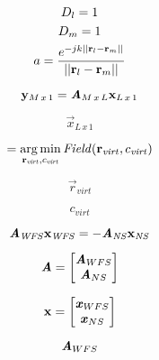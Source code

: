 \documentclass[10pt]{report}
\begin{document}
\begin{gather*}
	D_l = 1 \\
	D_m = 1 \\
	a = \frac{e^{-j k || \mathbf{r}_{l} - \mathbf{r}_{m} ||}}{|| \mathbf{r}_{l} - \mathbf{r}_{m} ||}
\end{gather*}

\begin{equation*}
	\mathbf{y}_{M\,x\,1} = \bm{\mathit{A}}_{M\,x\,L} \mathbf{x}_{L\,x\,1}
\end{equation*}

\begin{equation*}
	\vec{x}_{L\,x\,1}
\end{equation*}
	
\begin{equation*}
	[\vec{r}_{\mathit{opt}}, c_{\mathit{opt}}] = \argmin_{\vec{r}_{\mathit{virt}}, c_{\mathit{virt}}} \mathit{Field}(\vec{r}_{\mathit{virt}}, c_{\mathit{virt}})
\end{equation*}
	
\begin{equation*}
	\vec{r}_{\mathit{virt}}
\end{equation*}

\begin{equation*}
	c_{\mathit{virt}}
\end{equation*}	
	
\begin{equation*}
	\bm{\mathit{A}}_{\mathit{WFS}} \mathbf{x}_{\mathit{WFS}}  = - \bm{\mathit{A}}_{\mathit{NS}} \mathbf{x}_{\mathit{NS}}
\end{equation*}
	
\begin{equation*}
	\bm{\mathit{A}} = 
		\begin{bmatrix}
		\bm{\mathit{A}}_{WFS} \\
		\bm{\mathit{A}}_{NS} \\
		\end{bmatrix}
\end{equation*}	

\begin{equation*}
	\mathbf{x} = 
	\begin{bmatrix}
		\bm{\mathit{x}}_{WFS} \\
		\bm{\mathit{x}}_{NS} \\
	\end{bmatrix}
\end{equation*}	
	
\begin{equation*}
	\bm{\mathit{A}}_{WFS}
\end{equation*}		
\end{document}
